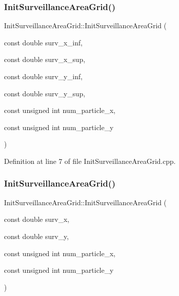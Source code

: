 \subsubsection{\texorpdfstring{Init\+Surveillance\+Area\+Grid()}{InitSurveillanceAreaGrid()}\hspace{0.1cm}{\footnotesize\ttfamily [1/2]}}
{\footnotesize\ttfamily Init\+Surveillance\+Area\+Grid\+::\+Init\+Surveillance\+Area\+Grid (\begin{DoxyParamCaption}\item[{const double}]{surv\+\_\+x\+\_\+inf,  }\item[{const double}]{surv\+\_\+x\+\_\+sup,  }\item[{const double}]{surv\+\_\+y\+\_\+inf,  }\item[{const double}]{surv\+\_\+y\+\_\+sup,  }\item[{const unsigned int}]{num\+\_\+particle\+\_\+x,  }\item[{const unsigned int}]{num\+\_\+particle\+\_\+y }\end{DoxyParamCaption})\hspace{0.3cm}{\ttfamily [noexcept]}}



Definition at line 7 of file Init\+Surveillance\+Area\+Grid.\+cpp.

\mbox{\label{classbfl_1_1InitSurveillanceAreaGrid_a5f8d40885ea408d56bd034193e7ef2f8}} 
\subsubsection{\texorpdfstring{Init\+Surveillance\+Area\+Grid()}{InitSurveillanceAreaGrid()}\hspace{0.1cm}{\footnotesize\ttfamily [2/2]}}
{\footnotesize\ttfamily Init\+Surveillance\+Area\+Grid\+::\+Init\+Surveillance\+Area\+Grid (\begin{DoxyParamCaption}\item[{const double}]{surv\+\_\+x,  }\item[{const double}]{surv\+\_\+y,  }\item[{const unsigned int}]{num\+\_\+particle\+\_\+x,  }\item[{const unsigned int}]{num\+\_\+particle\+\_\+y }\end{DoxyParamCaption})\hspace{0.3cm}{\ttfamily [noexcept]}}



